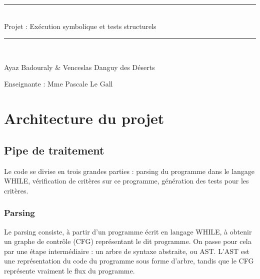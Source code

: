 \documentclass[a4paper, 12pt]{report}
\begin{document}
\begin{titlepage}
\newcommand{\HRule}{\rule{\linewidth}{0.5mm}}

\begin{center}

\HRule \\[0.4cm]
{ \huge Projet : Exécution symbolique et tests structurels}\\[0.4cm]
\HRule \\[2cm]

\vspace{2cm}

Ayaz Badouraly \& Venceslas Danguy des Déserts

\vspace{2cm}

Enseignante :
Mme Pascale Le Gall


\end{center}
\end{titlepage}



\tableofcontents
\newpage

\chapter{Architecture du projet}

\section{Pipe de traitement}

Le code se divise en trois grandes parties : parsing du programme dans le langage WHILE, vérification de critères sur ce programme, génération des tests pour les critères.

\subsection{Parsing}

Le parsing consiste, à partir d'un programme écrit en langage WHILE, à obtenir un graphe de contrôle (CFG) représentant le dit programme. On passe pour cela par une étape intermédiaire : un arbre de syntaxe abstraite, ou AST. L'AST est une représentation du code du programme sous forme d'arbre, tandis que le CFG représente vraiment le flux du programme. 

\end{document}
